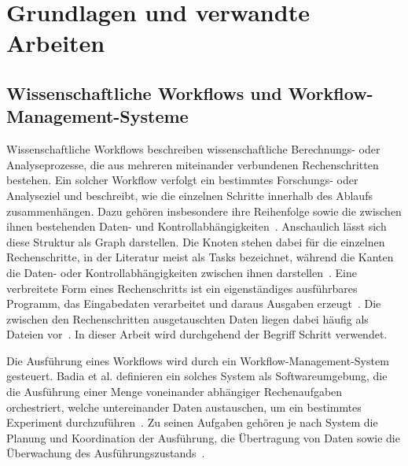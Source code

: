 
\chapter{Grundlagen und verwandte Arbeiten}
\label{sec:basics}



\section{Wissenschaftliche Workflows und Workflow-Management-Systeme}
\label{sec:basics:wms}
Wissenschaftliche Workflows beschreiben wissenschaftliche
Berechnungs- oder Analyseprozesse, die aus mehreren miteinander
verbundenen Rechenschritten bestehen. Ein solcher Workflow verfolgt
ein bestimmtes Forschungs- oder Analyseziel und beschreibt, wie die
einzelnen Schritte innerhalb des Ablaufs zusammenhängen. Dazu
gehören insbesondere ihre Reihenfolge sowie die zwischen ihnen
bestehenden Daten- und
Kontrollabhängigkeiten~\cite[S.~2]{suter2026terminology}.
Anschaulich lässt sich diese Struktur als Graph darstellen. Die
Knoten stehen dabei für die einzelnen Rechenschritte, in der
Literatur meist als Tasks bezeichnet, während die Kanten die Daten-
oder Kontrollabhängigkeiten zwischen ihnen
darstellen~\cite[S.~28\,f.]{badia2017workflows}. Eine verbreitete
Form eines Rechenschritts ist ein eigenständiges ausführbares
Programm, das Eingabedaten verarbeitet und daraus Ausgaben
erzeugt~\cite[S.~4]{suter2026terminology}. Die zwischen den
Rechenschritten ausgetauschten Daten liegen dabei häufig als Dateien
vor~\cite[S.~29]{badia2017workflows}. In dieser
Arbeit wird durchgehend der Begriff Schritt verwendet.
 
Die Ausführung eines Workflows wird durch ein
Workflow-Management-System gesteuert. Badia et al. definieren ein
solches System als Softwareumgebung, die die Ausführung einer Menge
voneinander abhängiger Rechenaufgaben orchestriert, welche
untereinander Daten austauschen, um ein bestimmtes Experiment
durchzuführen~\cite[S.~28]{badia2017workflows}.
Zu seinen Aufgaben gehören je nach System die Planung und
Koordination der Ausführung, die Übertragung von Daten sowie die
Überwachung des Ausführungszustands~\cite[S.~29]{badia2017workflows}\cite[S.~3]{suter2026terminology}.

